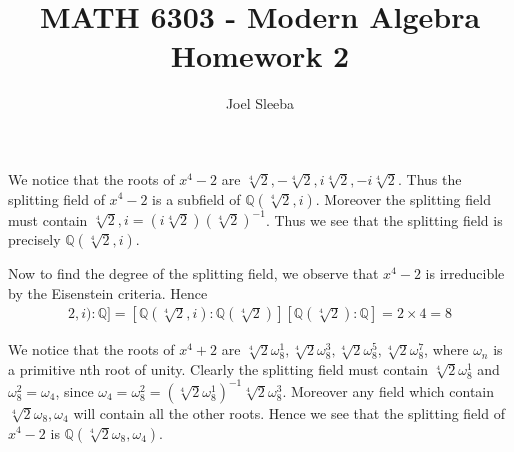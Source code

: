 \documentclass[12pt]{exam}
\theoremstyle{plain} %
\theoremstyle{definition} %
\theoremstyle{remark} %
\begin{document}
\title{MATH 6303 - Modern Algebra \\ Homework  2}

\author{
  Joel Sleeba \\
}

\maketitle
\printanswers
\unframedsolutions

\begin{questions}

  \question
  \begin{solution}
    We notice that the roots of $x^4 - 2$ are $\sqrt[4]{2},
    -\sqrt[4]{2}, i \sqrt[4]{2}, -i \sqrt[4]{2}$. Thus the splitting
    field of $x^4 - 2$ is a subfield of $\mathbb{Q}(\sqrt[4]{2}, i)$.
    Moreover the splitting field must contain $\sqrt[4]{2}, i = (i
    \sqrt[4]{2})(\sqrt[4]{2})^{-1}$. Thus we see that the splitting
    field is precisely $\mathbb{Q}(\sqrt[4]{2}, i)$.

    Now to find the degree of the splitting field, we observe that
    $x^4 - 2$ is irreducible by the Eisenstein criteria. Hence
    \begin{align*}
      [\mathbb{Q}(\sqrt[4]{2}, i): \mathbb{Q}] =
      [\mathbb{Q}(\sqrt[4]{2}, i) : \mathbb{Q}(\sqrt[4]{2})]
      [\mathbb{Q}(\sqrt[4]{2}): \mathbb{Q}] = 2 \times 4 = 8
    \end{align*}
  \end{solution}

  \question
  \begin{solution}
    We notice that the roots of $x^4 + 2$ are $\sqrt[4]{2}\omega_8^1
    , \sqrt[4]{2}\omega_8^3 , \sqrt[4]{2}\omega_8^5 ,
    \sqrt[4]{2}\omega_8^7$, where $\omega_n$ is a primitive nth root
    of unity.
    Clearly the splitting field must contain $\sqrt[4]{2} \omega_8^1$ and
    $\omega_8^2 = \omega_4$, since $\omega_4 = \omega_8^2 =
    (\sqrt[4]{2}\omega_8^1)^{-1}
    \sqrt[4]{2} \omega_8^3$.
    Moreover any field which contain $\sqrt[4]{2}\omega_8, \omega_4$ will
    contain all the other roots. Hence we see that the splitting
    field of $x^4 - 2$ is
    $\mathbb{Q}(\sqrt[4]{2}\omega_8, \omega_4)$.


\end{solution}
\end{questions}
\end{document}
